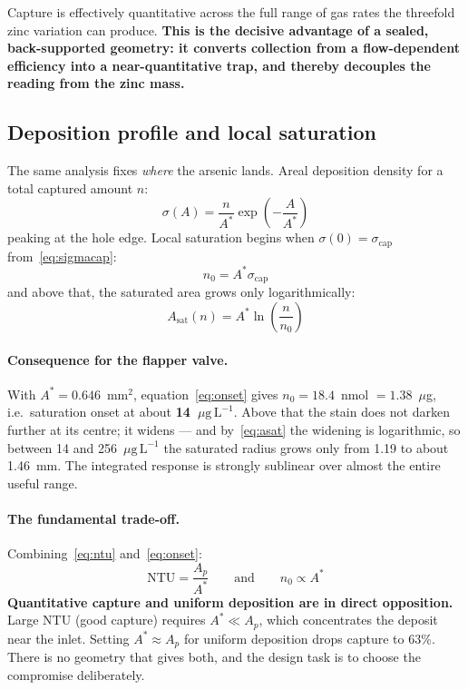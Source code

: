 \documentclass[11pt,a4paper]{article}
\newcommand{\ptl}{\ensuremath{\mu\mathrm{g\,L^{-1}}}}
\begin{document}
\noindent
Capture is effectively quantitative across the full range of gas rates the
threefold zinc variation can produce. \textbf{This is the decisive advantage
of a sealed, back-supported geometry: it converts collection from a
flow-dependent efficiency into a near-quantitative trap, and thereby
decouples the reading from the zinc mass.}

\subsection{Deposition profile and local saturation}
\label{sec:deposition}

The same analysis fixes \emph{where} the arsenic lands. Areal deposition
density for a total captured amount $n$:
\begin{equation}
  \sigma(A) = \frac{n}{A^{*}}\exp\!\left(-\frac{A}{A^{*}}\right)
  \label{eq:sigma}
\end{equation}
peaking at the hole edge. Local saturation begins when
$\sigma(0) = \sigma_{\text{cap}}$ from~\eqref{eq:sigmacap}:
\begin{equation}
  \boxed{\;n_0 = A^{*}\sigma_{\text{cap}}\;}
  \label{eq:onset}
\end{equation}
and above that, the saturated area grows only logarithmically:
\begin{equation}
  A_{\text{sat}}(n) = A^{*}\ln\!\left(\frac{n}{n_0}\right)
  \label{eq:asat}
\end{equation}

\paragraph{Consequence for the flapper valve.} With
$A^{*} = 0.646$~mm$^2$, equation~\eqref{eq:onset} gives
$n_0 = 18.4$~nmol $= 1.38$~\ensuremath{\mu}g, i.e.\ saturation onset at
about \textbf{14~\ptl{}}. Above that the stain does not darken further at
its centre; it widens --- and by~\eqref{eq:asat} the widening is
logarithmic, so between 14 and 256~\ptl{} the saturated radius grows only
from 1.19 to about 1.46~mm. The integrated response is strongly sublinear
over almost the entire useful range.

\paragraph{The fundamental trade-off.} Combining~\eqref{eq:ntu}
and~\eqref{eq:onset}:
\begin{equation}
  \mathrm{NTU} = \frac{A_p}{A^{*}}
  \qquad\text{and}\qquad
  n_0 \propto A^{*}
\end{equation}
\textbf{Quantitative capture and uniform deposition are in direct
opposition.} Large NTU (good capture) requires $A^{*} \ll A_p$, which
concentrates the deposit near the inlet. Setting $A^{*} \approx A_p$ for
uniform deposition drops capture to 63\%. There is no geometry that gives
both, and the design task is to choose the compromise deliberately.
\end{document}
